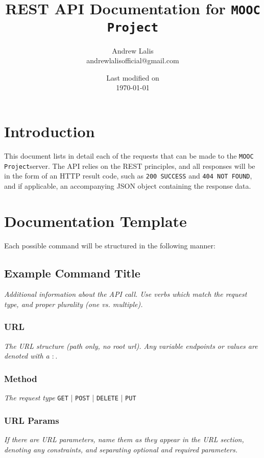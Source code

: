 \documentclass[a4paper, 12pt]{article}
\newcommand{\projectTitle}{\texttt{MOOC Project}}
\begin{document}
\title{REST API Documentation for \projectTitle}
\author{Andrew Lalis\\ andrewlalisofficial@gmail.com}
\date{Last modified on\\ \today}
\maketitle

\setcounter{tocdepth}{1}
\tableofcontents

\section{Introduction}
	This document lists in detail each of the requests that can be made to the \projectTitle server. The API relies on the REST principles, and all responses will be in the form of an HTTP result code, such as \texttt{200 SUCCESS} and \texttt{404 NOT FOUND}, and if applicable, an accompanying JSON object containing the response data.

\section{Documentation Template}
	Each possible command will be structured in the following manner:\\
	\subsection{Example Command Title}
		\textit{Additional information about the API call. Use verbs which match the request type, and proper plurality (one vs. multiple).}

		\subsubsection{URL}
			\textit{The URL structure (path only, no root url). Any variable endpoints or values are denoted with a $ : $.}

		\subsubsection{Method}
			\textit{The request type}
			\texttt{GET} | \texttt{POST} | \texttt{DELETE} | \texttt{PUT}

		\subsubsection{URL Params}
			\textit{If there are URL parameters, name them as they appear in the URL section, denoting any constraints, and separating optional and required parameters.}
\end{document}
